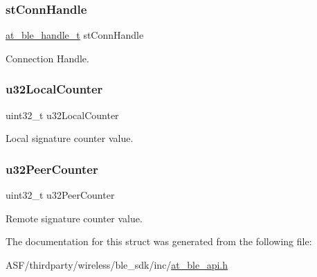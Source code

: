 \subsubsection{\texorpdfstring{stConnHandle}{stConnHandle}}
{\footnotesize\ttfamily \mbox{\hyperlink{at__ble__api_8h_abd23646d0c662860741f787efc8456f2}{at\+\_\+ble\+\_\+handle\+\_\+t}} st\+Conn\+Handle}



Connection Handle. 

\mbox{\label{structat__ble__sign__counter__t_a5f255db42fac0b9e8e252c34a7dc2406}} 
\subsubsection{\texorpdfstring{u32LocalCounter}{u32LocalCounter}}
{\footnotesize\ttfamily uint32\+\_\+t u32\+Local\+Counter}



Local signature counter value. 

\mbox{\label{structat__ble__sign__counter__t_a8b42ded8b6c29ef48dc9d09e76d96ce7}} 
\subsubsection{\texorpdfstring{u32PeerCounter}{u32PeerCounter}}
{\footnotesize\ttfamily uint32\+\_\+t u32\+Peer\+Counter}



Remote signature counter value. 



The documentation for this struct was generated from the following file\+:\begin{DoxyCompactItemize}
\item 
A\+S\+F/thirdparty/wireless/ble\+\_\+sdk/inc/\mbox{\hyperlink{at__ble__api_8h}{at\+\_\+ble\+\_\+api.\+h}}\end{DoxyCompactItemize}
